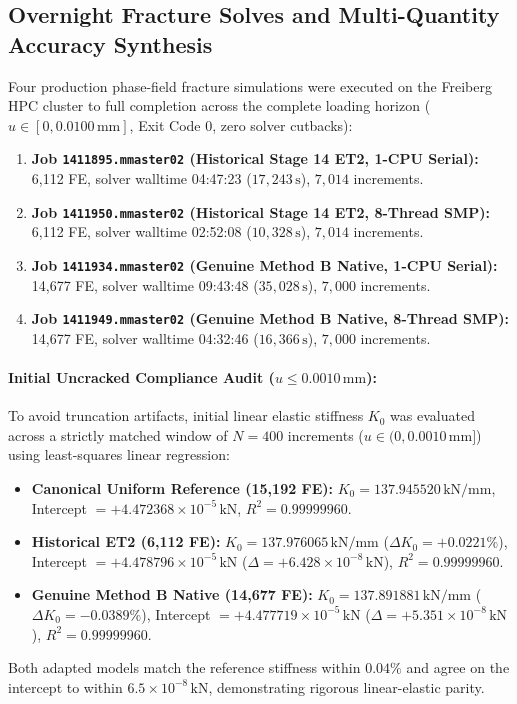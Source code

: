 \subsection{Overnight Fracture Solves and Multi-Quantity Accuracy Synthesis}
\label{subsec:gate6b_overnight_fracture_solves}

Four production phase-field fracture simulations were executed on the Freiberg HPC cluster to full completion across the complete loading horizon ($u \in [0, 0.0100\,\mathrm{mm}]$, Exit Code 0, zero solver cutbacks):
\begin{enumerate}
  \item \textbf{Job \texttt{1411895.mmaster02} (Historical Stage 14 ET2, 1-CPU Serial):} 6,112 FE, solver walltime 04:47:23 ($17{,}243\,\mathrm{s}$), $7{,}014$ increments.
  \item \textbf{Job \texttt{1411950.mmaster02} (Historical Stage 14 ET2, 8-Thread SMP):} 6,112 FE, solver walltime 02:52:08 ($10{,}328\,\mathrm{s}$), $7{,}014$ increments.
  \item \textbf{Job \texttt{1411934.mmaster02} (Genuine Method B Native, 1-CPU Serial):} 14,677 FE, solver walltime 09:43:48 ($35{,}028\,\mathrm{s}$), $7{,}000$ increments.
  \item \textbf{Job \texttt{1411949.mmaster02} (Genuine Method B Native, 8-Thread SMP):} 14,677 FE, solver walltime 04:32:46 ($16{,}366\,\mathrm{s}$), $7{,}000$ increments.
\end{enumerate}

\paragraph{Initial Uncracked Compliance Audit ($u \le 0.0010\,\mathrm{mm}$):}
To avoid truncation artifacts, initial linear elastic stiffness $K_0$ was evaluated across a strictly matched window of $N=400$ increments ($u \in (0, 0.0010\,\mathrm{mm}]$) using least-squares linear regression:
\begin{itemize}
  \item \textbf{Canonical Uniform Reference (15,192 FE):} $K_0 = 137.945520\,\mathrm{kN/mm}$, Intercept $= +4.472368 \times 10^{-5}\,\mathrm{kN}$, $R^2 = 0.99999960$.
  \item \textbf{Historical ET2 (6,112 FE):} $K_0 = 137.976065\,\mathrm{kN/mm}$ ($\Delta K_0 = +0.0221\%$), Intercept $= +4.478796 \times 10^{-5}\,\mathrm{kN}$ ($\Delta = +6.428 \times 10^{-8}\,\mathrm{kN}$), $R^2 = 0.99999960$.
  \item \textbf{Genuine Method B Native (14,677 FE):} $K_0 = 137.891881\,\mathrm{kN/mm}$ ($\Delta K_0 = -0.0389\%$), Intercept $= +4.477719 \times 10^{-5}\,\mathrm{kN}$ ($\Delta = +5.351 \times 10^{-8}\,\mathrm{kN}$), $R^2 = 0.99999960$.
\end{itemize}
Both adapted models match the reference stiffness within $0.04\%$ and agree on the intercept to within $6.5 \times 10^{-8}\,\mathrm{kN}$, demonstrating rigorous linear-elastic parity.

